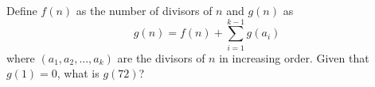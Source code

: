 Define $f(n)$ as the number of divisors of $n$ and $g(n)$ as \[g(n) =f(n) +\sum^{k-1}_{i=1} g (a_i)\]where $(a_1, a_2, ..., a_k)$ are the divisors of $n$ in increasing order. Given that $g(1) = 0$, what is $g(72)$?
